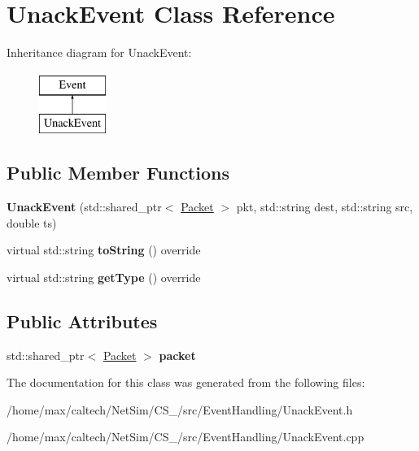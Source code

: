 \hypertarget{classUnackEvent}{\section{\-Unack\-Event \-Class \-Reference}
\label{classUnackEvent}
}
\-Inheritance diagram for \-Unack\-Event\-:\begin{figure}[H]
\begin{center}
\leavevmode
\includegraphics[height=2.000000cm]{classUnackEvent}
\end{center}
\end{figure}
\subsection*{\-Public \-Member \-Functions}
\begin{DoxyCompactItemize}
\item 
\hypertarget{classUnackEvent_af9ed3cfe7027d641ceddbd7a2ce560c7}{{\bfseries \-Unack\-Event} (std\-::shared\-\_\-ptr$<$ \hyperlink{classPacket}{\-Packet} $>$ pkt, std\-::string dest, std\-::string src, double ts)}\label{classUnackEvent_af9ed3cfe7027d641ceddbd7a2ce560c7}

\item 
\hypertarget{classUnackEvent_a7be801da20ad826acf9ebfeaa6ee8536}{virtual std\-::string {\bfseries to\-String} () override}\label{classUnackEvent_a7be801da20ad826acf9ebfeaa6ee8536}

\item 
\hypertarget{classUnackEvent_a56ca06731117d1fff95a1601abed02e8}{virtual std\-::string {\bfseries get\-Type} () override}\label{classUnackEvent_a56ca06731117d1fff95a1601abed02e8}

\end{DoxyCompactItemize}
\subsection*{\-Public \-Attributes}
\begin{DoxyCompactItemize}
\item 
\hypertarget{classUnackEvent_ad9d09191d5ee31c15c554e797a708f7d}{std\-::shared\-\_\-ptr$<$ \hyperlink{classPacket}{\-Packet} $>$ {\bfseries packet}}\label{classUnackEvent_ad9d09191d5ee31c15c554e797a708f7d}

\end{DoxyCompactItemize}


\-The documentation for this class was generated from the following files\-:\begin{DoxyCompactItemize}
\item 
/home/max/caltech/\-Net\-Sim/\-C\-S\-\_/src/\-Event\-Handling/\-Unack\-Event.\-h\item 
/home/max/caltech/\-Net\-Sim/\-C\-S\-\_/src/\-Event\-Handling/\-Unack\-Event.\-cpp\end{DoxyCompactItemize}

